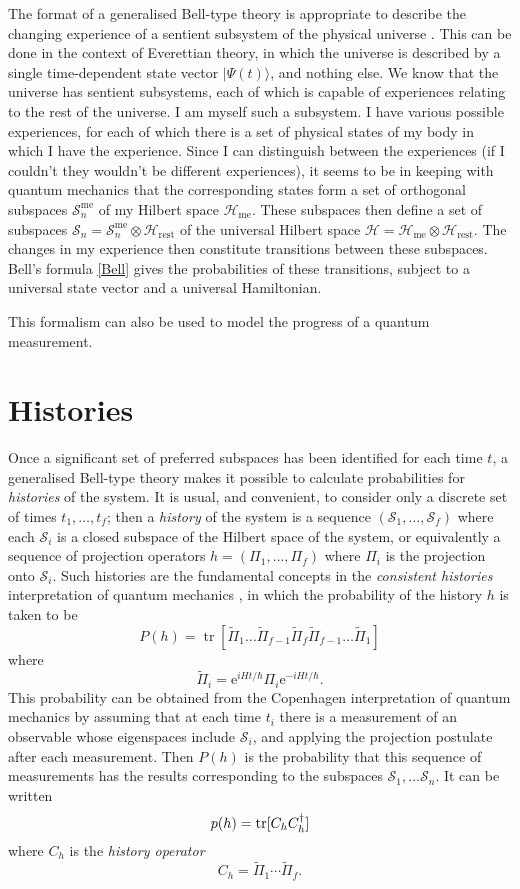 \documentclass[12pt,reqno]{article}
\newcommand{\be}{\begin{equation}}
\newcommand{\ee}{\end{equation}}
\renewcommand{\(}{\left(}
\renewcommand{\)}{\right)}
\renewcommand{\.}{\centerdot}
\newcommand{\e}{\mathrm{e}}
\renewcommand{\S}{\mathcal{S}}
\renewcommand{\H}{\mathcal{H}}
\newcommand{\1}{\mathbf{1}}
\newcommand{\<}{\langle}
\renewcommand{\>}{\rangle}
\newcommand{\tr}{\operatorname{tr}}
\theoremstyle{definition}
\theoremstyle{remark}
\numberwithin{equation}{section}
\newcommand{\Pii}{\widetilde{\Pi}}
\begin{document}
The format of a generalised Bell-type theory is appropriate to describe the changing experience of a sentient subsystem of the physical universe \cite{logicfuture}. This can be done in the context of Everettian theory, in which the universe is described by a single time-dependent state vector $|\Psi(t)\>$, and nothing else. We know that the universe has sentient subsystems, each of which is capable of experiences relating to the rest of the universe. I am myself such a subsystem. I have various possible experiences, for each of which there is a set of physical states of my body in which I have the experience. Since I can distinguish between the experiences (if I couldn't they wouldn't be different experiences), it seems to be in keeping with quantum mechanics that the corresponding states form a set of orthogonal subspaces $\S^{\text{me}}_n$ of my Hilbert space $\H_{\text{me}}$. These subspaces then define a set of subspaces $\S_n = \S_n^{\text{me}}\otimes\H_{\text{rest}}$ of the universal Hilbert space $\H = \H_{\text{me}}\otimes\H_{\text{rest}}$. The changes in my experience then constitute transitions between these subspaces. Bell's formula \eqref{Bell} gives the probabilities of these transitions, subject to a universal state vector and a universal Hamiltonian.

This formalism can also be used \cite{singleworld, Hollowood:classical} to model the progress of a quantum measurement. 

\section{Histories}

Once a significant set of preferred subspaces has been identified for each time $t$, a generalised Bell-type theory makes it possible to calculate probabilities for \emph{histories} of the system. It is usual, and convenient, to consider only a discrete set of times $t_1,\ldots,t_f$; then a \emph{history} of the system is a sequence $(\S_1,\ldots,\S_f)$ where each $\S_i$ is a closed subspace of the Hilbert space of the system, or equivalently a sequence of projection operators $h = (\Pi_1,\ldots,\Pi_f)$ where $\Pi_i$ is the projection onto $\S_i$. Such histories are the fundamental concepts in the \emph{consistent histories} interpretation of quantum mechanics \cite{Griffiths:book}, in which the probability of the history $h$ is taken to be
\be\label{consprob}
P(h) = \tr[\Pii_1\ldots\Pii_{f-1}\Pii_f\Pii_{f-1}\ldots\Pii_1]
\ee
where 
\[
\Pii_i = \e^{iHt/\hbar}\Pi_i\e^{-iHt/\hbar}.
\]
This probability can be obtained from the Copenhagen interpretation of quantum mechanics by assuming that at each time $t_i$ there is a measurement of an observable whose eigenspaces include $\S_i$, and applying the projection postulate after each measurement. Then $P(h)$ is the probability that this sequence of measurements has the results corresponding to the subspaces $\S_1,\ldots\S_n$. It can be written
\[
p(h) = \tr[C_h C_h^\dagger]\notag
\]
where $C_h$ is the \emph{history operator}
\be\label{historyop}
C_h = \Pii_1\cdots\Pii_f.
\ee
\end{document}
